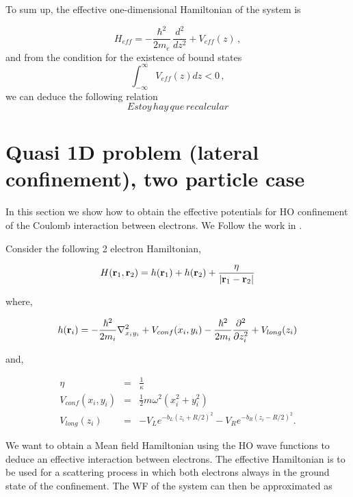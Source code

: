 \documentclass[a4paper,10pt]{article}
\begin{document}
To sum up, the effective one-dimensional Hamiltonian of the system is

\begin{equation}
  H_{eff} = -\frac{\hbar^2}{2 m_e}\,\frac{d^2}{dz^2} + V_{eff}(z)\,,
\end{equation}
\noindent and from the condition for the existence of bound states
\begin{equation}
  \int_{-\infty}^{\infty} V_{eff}(z) dz < 0\,,
\end{equation}
\noindent we can deduce the following relation
\begin{equation}
  Estoy\, hay\, que\, recalcular
\end{equation}

\section*{Quasi 1D problem (lateral confinement), two particle case}
In this section we show how to obtain the effective potentials for HO confinement of the
Coulomb interaction between electrons. We Follow the work
in \cite{bednarek_effective_2003}.

Consider the following 2 electron Hamiltonian,


\begin{equation}
H(\mathbf{r}_1, \mathbf{r}_2) = h(\mathbf{r}_1) + h(\mathbf{r}_2) +
\frac{\eta}{\left|\mathbf{r}_1-\mathbf{r}_2\right|}
\end{equation}

where,

\begin{equation}
h(\mathbf{r}_i) = -\frac{\hbar^2}{2 m_i}\nabla^2_{x_i y_i} + V_{conf}(x_i,y_i) - \frac{\hbar^2}{2
m_i}\frac{\partial^2}{\partial z_i^2} + V_{long}(z_i)
\end{equation}

and,

\begin{eqnarray}
\eta &=& \frac{1}{\kappa} \\
V_{conf}(x_i,y_i) &=& \frac{1}{2}m\omega^2(x^{2}_i + y^{2}_i) \\
V_{long}(z_i) &=& - V_L e^{-b_L (z_i + R/2)^2} - V_R e^{-b_R (z_i - R/2)^{2}}.
\end{eqnarray}

We want to obtain a Mean field Hamiltonian using the HO wave functions to deduce
an effective interaction between electrons. The effective Hamiltonian is to be used
for a scattering process in which both electrons always in the ground state of the
confinement. The WF of the system can then
be approximated as
\end{document}
